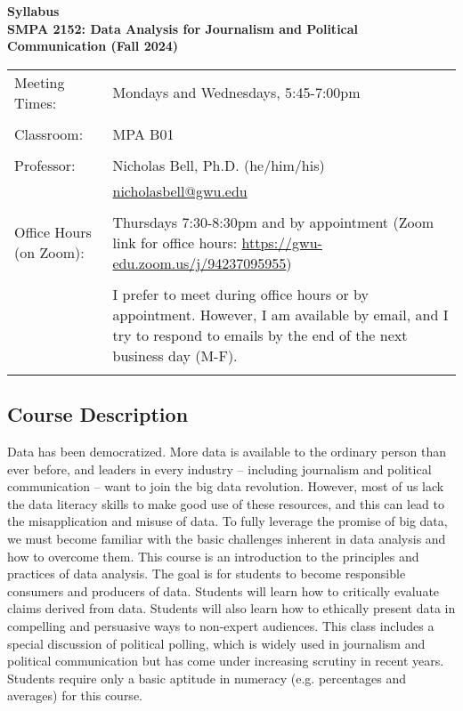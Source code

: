 \documentclass[12pt,letterpaper]{article}
\begin{document}
\begin{center}
\large
\textbf{Syllabus\\
\bigskip
SMPA 2152: Data Analysis for Journalism and Political Communication (Fall 2024)}
\end{center}

\begin{tabularx}{\textwidth}{l>{\raggedright\arraybackslash}X}
Meeting Times: & Mondays and Wednesdays, 5:45-7:00pm \\
\\
Classroom: & MPA B01 \\
\\
Professor: & Nicholas Bell, Ph.D. (he/him/his) \\
& \href{mailto:nicholasbell@gwu.edu}{nicholasbell@gwu.edu} \\
\\
Office Hours (on Zoom): & Thursdays 7:30-8:30pm and by appointment \newline
(Zoom link for office hours: \href{https://gwu-edu.zoom.us/j/94237095955}{https://gwu-edu.zoom.us/j/94237095955})\\
\\
& I prefer to meet during office hours or by appointment. However, I am available by email, and I try to respond to emails by the end of the next business day (M-F).\\
\\
\hline
\end{tabularx}

\subsection*{Course Description}

Data has been democratized. More data is available to the ordinary person than ever before, and leaders in every industry -- including journalism and political communication -- want to join the big data revolution. However, most of us lack the data literacy skills to make good use of these resources, and this can lead to the misapplication and misuse of data. To fully leverage the promise of big data, we must become familiar with the basic challenges inherent in data analysis and how to overcome them. This course is an introduction to the principles and practices of data analysis. The goal is for students to become responsible consumers and producers of data. Students will learn how to critically evaluate claims derived from data. Students will also learn how to ethically present data in compelling and persuasive ways to non-expert audiences. This class includes a special discussion of political polling, which is widely used in journalism and political communication but has come under increasing scrutiny in recent years. Students require only a basic aptitude in numeracy (e.g. percentages and averages) for this course. \par
\end{document}
